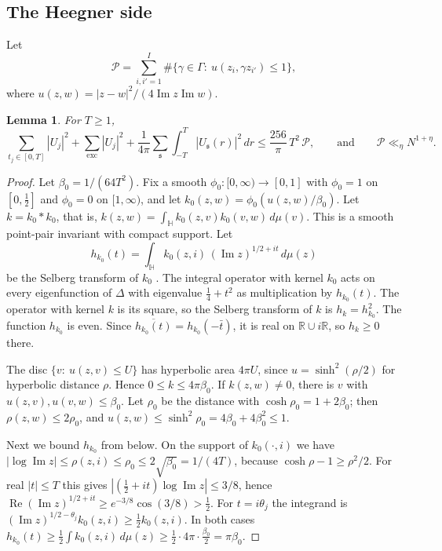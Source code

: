 \documentclass[11pt]{amsart}
\newtheorem{lemma}[theorem]{Lemma}
\theoremstyle{remark}
\theoremstyle{definition}
\numberwithin{equation}{section}
\newcommand{\Pc}{\mathcal{P}}
\newcommand{\R}{\mathbb{R}}
\newcommand{\Hb}{\mathbb{H}}
\newcommand{\gs}{\mathfrak{s}}
\newcommand{\exc}{\mathrm{exc}}
\begin{document}
\subsection{The Heegner side}
Let
\[
\Pc=\sum_{i,i'=1}^I\#\{\gamma\in\Gamma:\ u(z_i,\gamma z_{i'})\le1\},
\]
where $u(z,w)=|z-w|^2/(4\operatorname{Im}z\operatorname{Im}w)$.

\begin{lemma}\label{lem:heegner}
For $T\ge1$,
\[
\sum_{t_j\in[0,T]}|U_j|^2+\sum_{\exc}|U_j|^2+\frac1{4\pi}\sum_\gs\int_{-T}^T|U_\gs(r)|^2\,dr\le\frac{256}{\pi}\,T^2\,\Pc,\qquad\text{and}\qquad\Pc\ll_\eta N^{1+\eta}.
\]
\end{lemma}

\begin{proof}
Let $\beta_0=1/(64T^2)$. Fix a smooth $\phi_0:[0,\infty)\to[0,1]$ with $\phi_0=1$ on $[0,\frac12]$ and $\phi_0=0$ on $[1,\infty)$, and let $k_0(z,w)=\phi_0(u(z,w)/\beta_0)$. Let $k=k_0*k_0$, that is, $k(z,w)=\int_\Hb k_0(z,v)k_0(v,w)\,d\mu(v)$. This is a smooth point-pair invariant with compact support. Let
\[
h_{k_0}(t)=\int_\Hb k_0(z,i)\,(\operatorname{Im}z)^{1/2+it}\,d\mu(z)
\]
be the Selberg transform of $k_0$ \cite[Ch.~1]{Iw}. The integral operator with kernel $k_0$ acts on every eigenfunction of $\Delta$ with eigenvalue $\frac14+t^2$ as multiplication by $h_{k_0}(t)$. The operator with kernel $k$ is its square, so the Selberg transform of $k$ is $h_k=h_{k_0}^2$. The function $h_{k_0}$ is even. Since $\overline{h_{k_0}(t)}=h_{k_0}(-\bar t)$, it is real on $\R\cup i\R$, so $h_k\ge0$ there.

The disc $\{v:\ u(z,v)\le U\}$ has hyperbolic area $4\pi U$, since $u=\sinh^2(\rho/2)$ for hyperbolic distance $\rho$. Hence $0\le k\le4\pi \beta_0$. If $k(z,w)\ne0$, there is $v$ with $u(z,v),u(v,w)\le \beta_0$. Let $\rho_0$ be the distance with $\cosh\rho_0=1+2\beta_0$; then $\rho(z,w)\le2\rho_0$, and $u(z,w)\le\sinh^2\rho_0=4\beta_0+4\beta_0^2\le1$.

Next we bound $h_{k_0}$ from below. On the support of $k_0(\cdot,i)$ we have $|\log\operatorname{Im}z|\le\rho(z,i)\le\rho_0\le2\sqrt{\beta_0}=1/(4T)$, because $\cosh\rho-1\ge\rho^2/2$. For real $|t|\le T$ this gives $|(\frac12+it)\log\operatorname{Im}z|\le3/8$, hence $\operatorname{Re}(\operatorname{Im}z)^{1/2+it}\ge e^{-3/8}\cos(3/8)>\frac12$. For $t=i\theta_j$ the integrand is $(\operatorname{Im}z)^{1/2-\theta_j}k_0(z,i)\ge\frac12k_0(z,i)$. In both cases $h_{k_0}(t)\ge\frac12\int k_0(z,i)\,d\mu(z)\ge\frac12\cdot4\pi\cdot\frac{\beta_0}2=\pi \beta_0$.


\end{proof}
\end{document}
